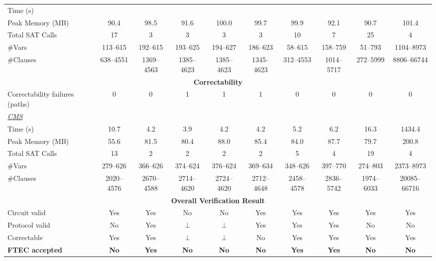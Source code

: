 \documentclass[acmsmall,screen,review,anonymous,nonacm]{acmart}
\begin{document}
\begin{table}[!tbp]
{\begin{tabular}{l ccccccccc}
Time (s) & & & & & & & & & \\
Peak Memory (MB) & 90.4 & 98.5 & 91.6 & 100.0 & 99.7 & 99.9 & 92.1 & 90.7 & 101.4 \\
Total SAT Calls & 17 & 3 & 3 & 3 & 3 & 10 & 7 & 25 & 4 \\
\#Vars & 113--615 & 192--615 & 193--625 & 194--627 & 186--623 & 58--615 & 158--759 & 51--793 & 1104--8973 \\
\#Clauses & 638--4551 & 1369--4563 & 1385--4623 & 1385--4623 & 1345--4623 & 312--4553 & 1014--5717 & 272--5999 & 8806--66744 \\
\midrule
\multicolumn{10}{c}{\textbf{Correctability}} \\
\midrule
Correctability failures (paths) & 0 & 0 & 1 & 1 & 1 & 0 & 0 & 0 & 0 \\
\midrule
\multicolumn{10}{l}{\underline{\textit{CMS}}} \\
Time (s) & 10.7 & 4.2 & 3.9 & 4.2 & 4.2 & 5.2 & 6.2 & 16.3 & 1434.4 \\
Peak Memory (MB) & 55.6 & 81.5 & 80.4 & 88.0 & 85.4 & 84.0 & 87.7 & 79.7 & 200.8 \\
Total SAT Calls & 13 & 2 & 2 & 2 & 2 & 5 & 4 & 19 & 4 \\
\#Vars & 279--626 & 366--626 & 374--624 & 376--624 & 369--634 & 348--626 & 397--770 & 274--803 & 2373--8973 \\
\#Clauses & 2020--4576 & 2670--4588 & 2714--4620 & 2724--4620 & 2712--4648 & 2458--4578 & 2836--5742 & 1974--6033 & 20085--66716 \\
\midrule
\multicolumn{10}{c}{\textbf{Overall Verification Result}} \\
\midrule
Circuit valid & Yes & Yes & No & No & Yes & Yes & Yes & Yes & Yes \\
Protocol valid & No & Yes & $\bot$ & $\bot$ & Yes & Yes & Yes & No & No \\
Correctable & Yes & Yes & $\bot$ & $\bot$ & No & Yes & Yes & Yes & Yes \\
\textbf{FTEC accepted} & \textbf{No} & \textbf{Yes} & \textbf{No} & \textbf{No} & \textbf{No} & \textbf{Yes} & \textbf{Yes} & \textbf{No} & \textbf{No} \\
\bottomrule
\end{tabular}%
}

\vspace*{0.5em} %


\end{table}
\end{document}
